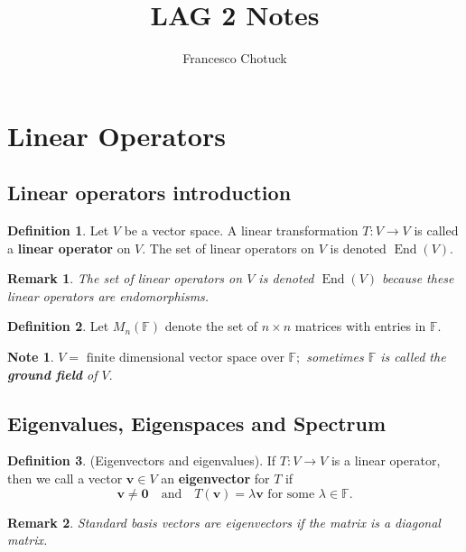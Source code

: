 \documentclass[12pt, a4paper]{article}
\title{LAG 2 Notes}
\date{}
\author{Francesco Chotuck}
\newcommand{\bb}[1]{\mathbb{#1}}
\DeclareMathOperator{\End}{End}
\newtheorem*{remark}{Remark}
\newtheorem*{note}{Note}
\theoremstyle{definition}
\newtheorem{definition}{Definition}[section]
\theoremstyle{plain}
\begin{document}
 
\maketitle 

\tableofcontents

\pagebreak

\section{Linear Operators}

\subsection{Linear operators introduction}

\begin{definition}
Let $V$ be a vector space. A linear transformation $T:V\rightarrow V$ is called a \textbf{linear operator} on $V.$ The set of linear operators on $V$ is denoted $\End{(V)}.$
\end{definition}

\begin{remark}
The set of linear operators on $V$ is denoted $\End(V)$ because these linear operators are endomorphisms. 
\end{remark}

\begin{definition}
Let $M_n(\bb{F})$ denote the set of $n\times n$ matrices with entries in $\bb{F}.$
\end{definition}

\begin{note}
$V=\text{ finite dimensional vector space over } \bb{F};$ sometimes $\bb{F}$ is called the \textbf{ground field} of $V.$ 
\end{note}

\subsection{Eigenvalues, Eigenspaces and Spectrum}

\begin{definition}
(Eigenvectors and eigenvalues). If $T:V\rightarrow V$ is a linear operator, then we call a vector $\mathbf{v} \in V$ an \textbf{eigenvector} for $T$ if $$\mathbf{v} \neq \mathbf{0} \quad \text{and} \quad T(\mathbf{v})=\lambda \mathbf{v} \text{ for some } \lambda \in \bb{F}.$$
\end{definition}

\begin{remark}
Standard basis vectors are eigenvectors if the matrix is a diagonal matrix.
\end{remark}
\end{document}
